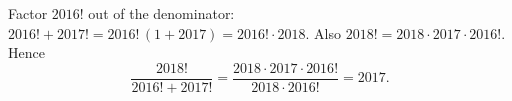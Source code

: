 Factor $2016!$ out of the denominator: $2016!+2017!=2016!\,(1+2017)=2016!\cdot2018$. Also $2018!=2018\cdot2017\cdot2016!$. Hence
\[
\dfrac{2018!}{2016!+2017!}=\dfrac{2018\cdot2017\cdot2016!}{2018\cdot2016!}=\boxed{2017}.
\]
